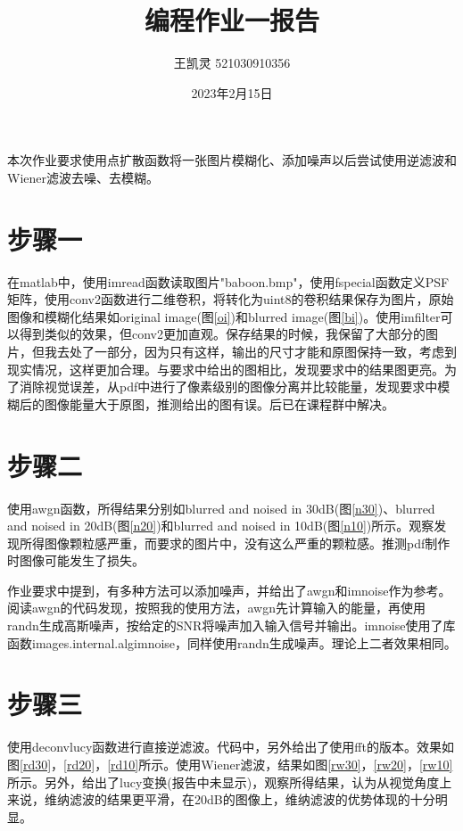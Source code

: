 \documentclass[a4paper]{article}
\title{编程作业一报告}
\author{王凯灵 521030910356}
\date{2023年2月15日}
\begin{document}
	\maketitle
	本次作业要求使用点扩散函数将一张图片模糊化、添加噪声以后尝试使用逆滤波和Wiener滤波去噪、去模糊。
	
	\section{步骤一}
	在matlab中，使用imread函数读取图片"baboon.bmp"，使用fspecial函数定义PSF矩阵，使用conv2函数进行二维卷积，将转化为uint8的卷积结果保存为图片，原始图像和模糊化结果如original image(图\ref{oi})和blurred image(图\ref{bi})。使用imfilter可以得到类似的效果，但conv2更加直观。保存结果的时候，我保留了大部分的图片，但我去处了一部分，因为只有这样，输出的尺寸才能和原图保持一致，考虑到现实情况，这样更加合理。与要求中给出的图相比，发现要求中的结果图更亮。为了消除视觉误差，从pdf中进行了像素级别的图像分离并比较能量，发现要求中模糊后的图像能量大于原图，推测给出的图有误。后已在课程群中解决。
	
	\section{步骤二}
	使用awgn函数，所得结果分别如blurred and noised in 30dB(图\ref{n30})、blurred and noised in 20dB(图\ref{n20})和blurred and noised in 10dB(图\ref{n10})所示。观察发现所得图像颗粒感严重，而要求的图片中，没有这么严重的颗粒感。推测pdf制作时图像可能发生了损失。
	
	作业要求中提到，有多种方法可以添加噪声，并给出了awgn和imnoise作为参考。阅读awgn的代码发现，按照我的使用方法，awgn先计算输入的能量，再使用randn生成高斯噪声，按给定的SNR将噪声加入输入信号并输出。imnoise使用了库函数images.internal.algimnoise，同样使用randn生成噪声。理论上二者效果相同。
	
	\section{步骤三}
	使用deconvlucy函数进行直接逆滤波。代码中，另外给出了使用fft的版本。效果如图\ref{rd30}，\ref{rd20}，\ref{rd10}所示。使用Wiener滤波，结果如图\ref{rw30}，\ref{rw20}，\ref{rw10}所示。另外，给出了lucy变换(报告中未显示)，观察所得结果，认为从视觉角度上来说，维纳滤波的结果更平滑，在20dB的图像上，维纳滤波的优势体现的十分明显。
	
\end{document}
